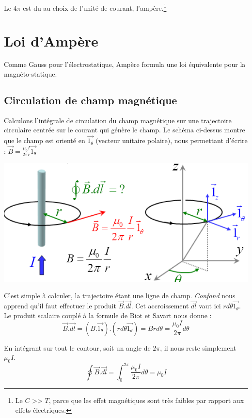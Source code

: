 \documentclass	[11pt, a4paper, openany]{book}
\begin{document}
Le $4\pi$ est du au choix de l'unité de courant, l'ampère.\footnote{Le $C$ >> $T$, parce que les effet magnétiques sont très faibles par rapport aux effets électriques.}

\section{Loi d'Ampère}
Comme Gauss pour l'électrostatique, Ampère formula une loi équivalente pour la magnéto-statique.
\subsection{Circulation de champ magnétique}
Calculons l'intégrale de circulation du champ magnétique sur une trajectoire circulaire centrée sur le courant qui génère le champ. Le schéma ci-dessus montre  que le champ est orienté en $\vec{1_\theta}$ (vecteur unitaire polaire), nous permettant d'écrire : $\vec{B} = \frac{\mu_0 I}{2\pi r}\vec{1_\theta}$
\begin{center}
\includegraphics[scale=0.65]{magneto/image5.png}
\end{center}

C'est simple à calculer, la trajectoire étant une ligne de champ. \textit{Confond} nous apprend qu'il faut effectuer le produit $\vec{B}.\vec{dl}$. Cet accroissement $\vec{dl}$ vaut ici $rd\theta\vec{1_\theta}$. Le produit scalaire couplé à la formule de Biot et Savart nous donne :
\begin{equation}
\vec{B}.\vec{dl} = (B.\vec{1_\theta}).(rd\theta\vec{1_\theta}) = Brd\theta = \frac{\mu_0 I}{2\pi} d\theta
\end{equation}

En intégrant sur tout le contour, soit un angle de $2\pi$, il nous reste simplement $\mu_0 I$.
\begin{equation}
\oint \vec{B}.\vec{dl} = \int_0^{2\pi} \frac{\mu_0 I}{2\pi} d\theta = \mu_0 I
\end{equation}
\end{document}
